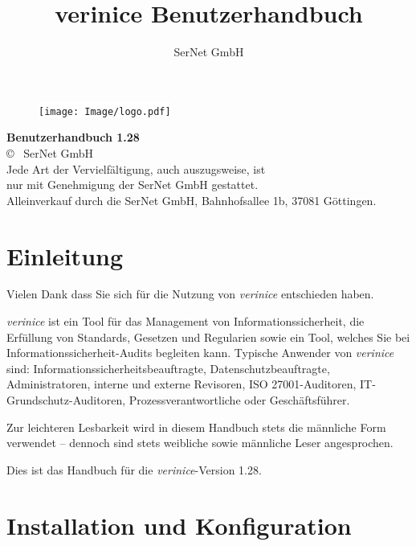 \documentclass[a4paper,10pt]{book}
\title{verinice Benutzerhandbuch \vnversion{}}
\author{SerNet GmbH}
\newcommand*{\vnversion}{1.28}
\begin{document}

\begin{titlepage}
  \centering
  \vspace{1cm}
  \begin{figure}[htb!]
    \centering
    \colorbox{white}{\texttt{[image: Image/logo.pdf]}}
  \end{figure}
  \huge\textbf{Benutzerhandbuch \vnversion{}}\\
  \small
  \vspace{13.5cm}
  \copyright{} \the\year\ SerNet GmbH\\
  Jede Art der Vervielfältigung, auch auszugsweise, ist\\
  nur mit Genehmigung der SerNet GmbH gestattet.\\
  Alleinverkauf durch die SerNet GmbH, Bahnhofsallee 1b, 37081 Göttingen.
  \normalsize
\end{titlepage}

\tableofcontents

\listoftables

\listoffigures


\chapter{Einleitung}


Vielen Dank dass Sie sich für die Nutzung von \textit{verinice} entschieden
haben.

\textit{verinice} ist ein Tool für das Management von Informationssicherheit,
die Erfüllung von Standards, Gesetzen und Regularien sowie ein Tool, welches Sie
bei Informationssicherheit-Audits begleiten kann. Typische Anwender von
\textit{verinice} sind: Informationssicherheitsbeauftragte,
Datenschutzbeauftragte, Administratoren, interne und externe Revisoren, ISO
27001-Auditoren, IT-Grundschutz-Auditoren, Prozessverantwortliche oder
Geschäftsführer.

Zur leichteren Lesbarkeit wird in diesem Handbuch stets die männliche Form
verwendet – dennoch sind stets weibliche sowie männliche Leser angesprochen.

Dies ist das Handbuch für die \textit{verinice}-Version \vnversion{}.

\newpage


\chapter{Installation und Konfiguration}
\end{document}
